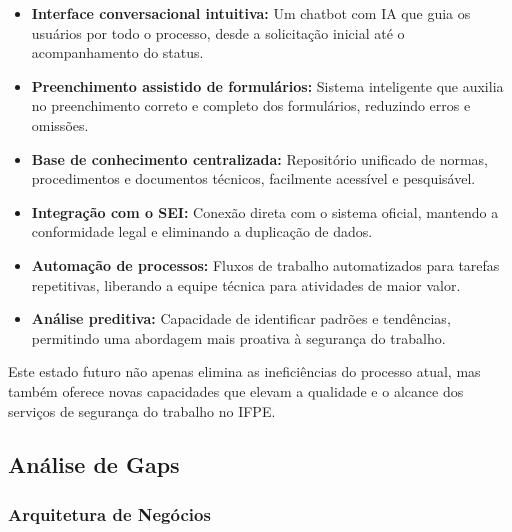 \documentclass[12pt,a4paper]{article}
\begin{document}
\begin{itemize}
    \item \textbf{Interface conversacional intuitiva:} Um chatbot com IA que guia os usuários por todo o processo, desde a solicitação inicial até o acompanhamento do status.
    
    \item \textbf{Preenchimento assistido de formulários:} Sistema inteligente que auxilia no preenchimento correto e completo dos formulários, reduzindo erros e omissões.
    
    \item \textbf{Base de conhecimento centralizada:} Repositório unificado de normas, procedimentos e documentos técnicos, facilmente acessível e pesquisável.
    
    \item \textbf{Integração com o SEI:} Conexão direta com o sistema oficial, mantendo a conformidade legal e eliminando a duplicação de dados.
    
    \item \textbf{Automação de processos:} Fluxos de trabalho automatizados para tarefas repetitivas, liberando a equipe técnica para atividades de maior valor.
    
    \item \textbf{Análise preditiva:} Capacidade de identificar padrões e tendências, permitindo uma abordagem mais proativa à segurança do trabalho.
\end{itemize}

Este estado futuro não apenas elimina as ineficiências do processo atual, mas também oferece novas capacidades que elevam a qualidade e o alcance dos serviços de segurança do trabalho no IFPE.

\subsection{Análise de Gaps}

\subsubsection{Arquitetura de Negócios}
\end{document}
